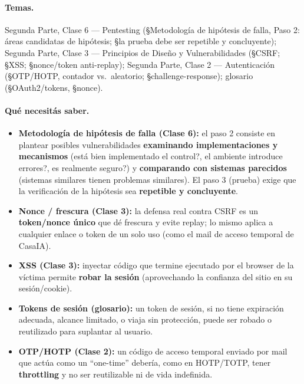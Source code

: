 \paragraph{Temas.}
Segunda Parte, Clase 6 --- Pentesting (\S Metodología de hipótesis de falla, Paso 2:
áreas candidatas de hipótesis; \S la prueba debe ser repetible y concluyente);
Segunda Parte, Clase 3 --- Principios de Diseño y Vulnerabilidades (\S CSRF; \S XSS;
\S nonce/token anti-replay); Segunda Parte, Clase 2 --- Autenticación (\S OTP/HOTP,
contador vs.\ aleatorio; \S challenge-response); glosario (\S OAuth2/tokens,
\S nonce).

\paragraph{Qué necesitás saber.}
\begin{itemize}
  \item \textbf{Metodología de hipótesis de falla (Clase 6):} el paso 2 consiste en
  plantear posibles vulnerabilidades \textbf{examinando implementaciones y
  mecanismos} (\textquestiondown{}está bien implementado el control?, \textquestiondown{}el ambiente introduce
  errores?, \textquestiondown{}es realmente seguro?) y \textbf{comparando con sistemas parecidos}
  (sistemas similares tienen problemas similares). El paso 3 (prueba) exige que la
  verificación de la hipótesis sea \textbf{repetible y concluyente}.
  \item \textbf{Nonce / frescura (Clase 3):} la defensa real contra CSRF es un
  \textbf{token/nonce único} que dé frescura y evite replay; lo mismo aplica a
  cualquier enlace o token de un solo uso (como el mail de acceso temporal de
  CasaIA).
  \item \textbf{XSS (Clase 3):} inyectar código que termine ejecutado por el
  browser de la víctima permite \textbf{robar la sesión} (aprovechando la confianza
  del sitio en su sesión/cookie).
  \item \textbf{Tokens de sesión (glosario):} un token de sesión, si no tiene
  expiración adecuada, alcance limitado, o viaja sin protección, puede ser robado o
  reutilizado para suplantar al usuario.
  \item \textbf{OTP/HOTP (Clase 2):} un código de acceso temporal enviado por mail
  que actúa como un ``one-time'' debería, como en HOTP/TOTP, tener \textbf{throttling}
  y no ser reutilizable ni de vida indefinida.
\end{itemize}

